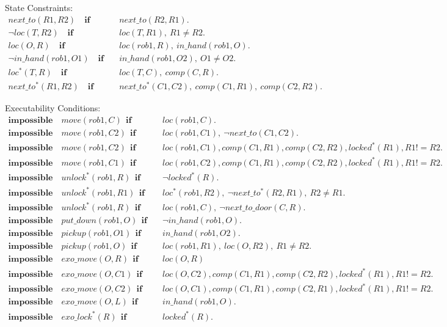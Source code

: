 \documentclass[11pt, oneside]{article}
\begin{document}
State Constraints:
\begin{align*}
  next\_to(R1,R2)\quad \mathbf{if}&\quad next\_to(R2,R1).\\
  \neg loc(T, R2)\quad \mathbf{if}&\quad loc(T, R1), ~R1 \neq R2.\\
  loc(O, R)\quad \mathbf{if}&\quad loc(rob1, R),~in\_hand(rob1,O).\\
  \neg in\_hand(rob1,O1)\quad \mathbf{if}&\quad in\_hand(rob1,O2),~ O1 \neq O2.\\
loc^*(T,R)\quad \mathbf{if}&\quad loc(T,C),~comp(C,R).\\
next\_to^*(R1,R2)\quad \mathbf{if}&\quad next\_to^*(C1,C2),~comp(C1,R1),~comp(C2,R2).
\end{align*}



Executability Conditions:
\begin{align*}
  \mathbf{impossible}\quad move(rob1, C)~~\mathbf{if}&\quad loc(rob1,C).\\
  \mathbf{impossible}\quad move(rob1, C2)~~\mathbf{if}&\quad loc(rob1,C1),~\neg next\_to(C1,C2).\\
   \mathbf{impossible}\quad move(rob1,C2)~~\mathbf{if}&\quad loc(rob1,C1), comp(C1,R1), comp(C2,R2), locked^*(R1), R1 != R2.\\ 
  \mathbf{impossible}\quad move(rob1,C1)~~\mathbf{if}&\quad loc(rob1,C2), comp(C1,R1), comp(C2,R2), locked^*(R1), R1 != R2.\\
  \mathbf{impossible}\quad unlock^*(rob1, R)~~\mathbf{if}&\quad \neg locked^*(R).\\
  \mathbf{impossible}\quad unlock^*(rob1, R1)~~\mathbf{if}&\quad loc^*(rob1,R2),~\neg next\_to^*(R2,R1),~R2\neq R1.\\
  \mathbf{impossible}\quad unlock^*(rob1, R)~~\mathbf{if}&\quad loc(rob1, C),~\neg next\_to\_door(C, R).\\
  \mathbf{impossible}\quad put\_down(rob1,O)~~\mathbf{if}&\quad \neg in\_hand(rob1,O).\\
  \mathbf{impossible}\quad pickup(rob1,O1)~~\mathbf{if}&\quad in\_hand(rob1,O2).\\
  \mathbf{impossible}\quad pickup(rob1,O)~~\mathbf{if}&\quad loc(rob1,R1),~loc(O,R2),~R1 \neq R2.\\
  \mathbf{impossible}\quad exo\_move(O,R)~~\mathbf{if}&\quad loc(O,R)\\
  \mathbf{impossible}\quad exo\_move(O,C1)~~\mathbf{if}&\quad loc(O, C2), comp(C1, R1), comp(C2, R2), locked^*(R1), R1 != R2.\\
  \mathbf{impossible}\quad exo\_move(O,C2)~~\mathbf{if}&\quad loc(O,C1), comp(C1, R1), comp(C2, R1), locked^*(R1), R1 != R2.\\
  \mathbf{impossible}\quad exo\_move(O,L)~~\mathbf{if}&\quad in\_hand(rob1,O).\\
  \mathbf{impossible}\quad exo\_lock^*(R)~~\mathbf{if}&\quad locked^*(R).
\end{align*}
\end{document}
